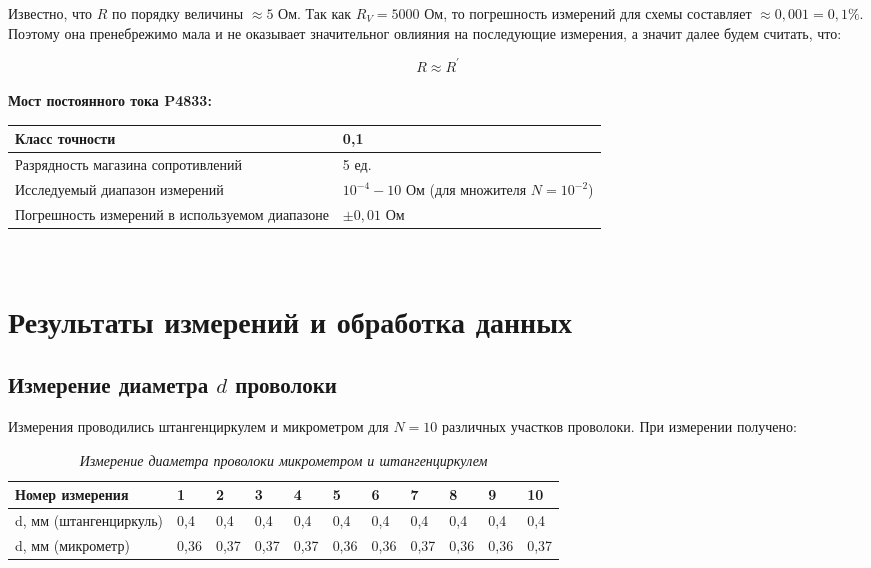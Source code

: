 \documentclass[a4paper,12pt]{article} %
\begin{document}
\medskip

Известно, что $R$ по порядку величины $\approx 5 \text{ Ом}$. Так как $R_V = 5000 \text{ Ом}$, то погрешность измерений для схемы составляет $\approx 0,001 = 0,1 \%$. Поэтому она пренебрежимо мала и не оказывает значительног овлияния на последующие измерения, а значит далее будем считать, что:

\begin{equation}
R\approx R^\prime
\end{equation}\\

\noindent\textbf{Мост постоянного тока P4833:}\\
\begin{tabular}{|p{8cm}|p{7cm}|}
	\hline
	Класс точности&0,1 \\
	\hline
	Разрядность магазина сопротивлений& 5 ед. \\
	\hline
	Исследуемый диапазон измерений& $ 10^{-4} - 10 \text{ Ом} $ (для множителя $ N = 10^{-2} $) \\
	\hline
	Погрешность измерений в используемом диапазоне& $\pm0,01\text{ Ом}$ \\
	\hline
\end{tabular}\\

\section{Результаты измерений и обработка данных}

\subsection{Измерение диаметра $d$ проволоки}

Измерения проводились штангенциркулем и микрометром для $N = 10$ различных участков проволоки. При измерении получено:

\begin{table}[h]
\begin{tabular}{|l|l|l|l|l|l|l|l|l|l|l|}
    \hline
    Номер   измерения & 1    & 2    & 3    & 4    & 5    & 6    & 7    & 8    & 9    & 10   \\ 
    \hline
    d, мм (штангенциркуль) & 0,4 & 0,4 & 0,4 & 0,4 & 0,4 & 0,4 & 0,4 & 0,4 & 0,4 & 0,4 \\ 
    \hline
    d, мм (микрометр) & 0,36 & 0,37 & 0,37 & 0,37 & 0,36 & 0,36 & 0,37 & 0,36 & 0,36 & 0,37 \\ 
    \hline
\end{tabular}\caption{\textit{Измерение диаметра проволоки микрометром и штангенциркулем}}
\end{table}
\end{document}
